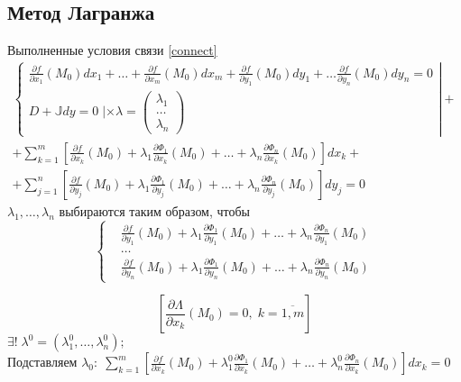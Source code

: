 \subsection{Метод Лагранжа}
Выполненные условия связи \ref{connect} 
	\begin{multline*}
		\left\{
			\begin{aligned}
				\frac{\partial f}{\partial x_1}(M_0)dx_1+ \dots + 
				\frac{\partial f}{\partial x_m}(M_0)dx_m+ 
				\frac{\partial f}{\partial y_1}(M_0)dy_1+ \dots
				\frac{\partial f}{\partial y_n}(M_0)dy_n = 0
				\\
				D+\mathbb{J}dy=0 \; | \times \lambda=
					\begin{pmatrix}
						\lambda_1 \\ \dots\\ \lambda_n
					\end{pmatrix}
			\end{aligned} 
		\right| + 
		\\
		+\sum\limits_{k=1}^m \left[\frac{\partial f}{\partial x_k}(M_0) + \lambda_1  \frac{\partial \Phi_1}{\partial x_k}(M_0)+ \dots + \lambda_n  \frac{\partial \Phi_n}{\partial x_k}(M_0)\right]dx_k+ 
		\\
		+\sum\limits_{j=1}^n \left[\frac{\partial f}{\partial y_j}(M_0) + \lambda_1  \frac{\partial \Phi_1}{\partial y_j}(M_0)+ \dots + \lambda_n \frac{\partial \Phi_n}{\partial y_j}(M_0)\right]dy_j=0
	\end{multline*}
$\lambda_1, \dots, \lambda_n $ выбираются таким образом, чтобы \\
\begin{equation}\label{lambda0sist2}
	\left\{ \begin{array}{rcl}
		&\frac{\partial f}{\partial y_1}(M_0) + \lambda_1  \frac{\partial \Phi_1}{\partial y_1}(M_0)+ \dots + \lambda_n  \frac{\partial \Phi_n}{\partial y_1}(M_0)
		\\ &\dots \\
		&\frac{\partial f}{\partial y_n}(M_0) + \lambda_1  \frac{\partial \Phi_1}{\partial y_n}(M_0)+ \dots + \lambda_n  \frac{\partial \Phi_n}{\partial y_n}(M_0)
	\end{array}\right.
\end{equation}
	
\begin{equation}\label{lambda0sist2'}
\left[ \frac{\partial \Lambda}{\partial x_k}(M_0) = 0, \; k=\overline{1,m}    \right]
\end{equation}
$\exists! \; \lambda^0=(\lambda^0_1, \dots, \lambda_n^0);$\\
Подставляем $\lambda_0: \; 
\sum\limits_{k=1}^m \left[\frac{\partial f}{\partial x_k}(M_0) + \lambda^0_1  \frac{\partial \Phi_1}{\partial x_k}(M_0)+ \dots + \lambda^0_n  \frac{\partial \Phi_n}{\partial x_k}(M_0)\right]dx_k=0$

